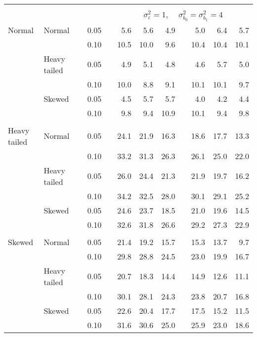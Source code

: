 \begin{table}[ht]
\begin{scriptsize}
\begin{tabular}{ll p{.1cm} c p{.1cm} rrr p{.1cm} rrr}
&&&&&&&&&&&\\
& && && \multicolumn{7}{c}{$\sigma_{\varepsilon}^2 = 1$, \ \ $\sigma_{b_0}^2 = \sigma_{b_1}^2 = 4$} \\ \cline{6-12}
\rowcolor{gray!20} Normal & Normal &  & 0.05 &  & 5.6 & 5.6 & 4.9 &  & 5.0 & 6.4 & 5.7 \\ 
\rowcolor{gray!20}    &  &  & 0.10 &  & 10.5 & 10.0 & 9.6 &  & 10.4 & 10.4 & 10.1 \\ 
\rowcolor{gray!20}    & Heavy tailed &  & 0.05 &  & 4.9 & 5.1 & 4.8 &  & 4.6 & 5.7 & 5.0 \\ 
\rowcolor{gray!20}    &  &  & 0.10 &  & 10.0 & 8.8 & 9.1 &  & 10.1 & 10.1 & 9.7 \\ 
\rowcolor{gray!20}    & Skewed &  & 0.05 &  & 4.5 & 5.7 & 5.7 &  & 4.0 & 4.2 & 4.4 \\ 
\rowcolor{gray!20}    &  &  & 0.10 &  & 9.8 & 9.4 & 10.9 &  & 10.1 & 9.4 & 9.8 \\ 
&&&&&&&&&&&\\
  Heavy tailed & Normal &  & 0.05 &  & 24.1 & 21.9 & 16.3 &  & 18.6 & 17.7 & 13.3 \\ 
  &  &  & 0.10 &  & 33.2 & 31.3 & 26.3 &  & 26.1 & 25.0 & 22.0 \\ 
  & Heavy tailed &  & 0.05 &  & 26.0 & 24.4 & 21.3 &  & 21.9 & 19.7 & 16.2 \\ 
  &  &  & 0.10 &  & 34.2 & 32.5 & 28.0 &  & 30.1 & 29.1 & 25.2 \\ 
  & Skewed &  & 0.05 &  & 24.6 & 23.7 & 18.5 &  & 21.0 & 19.6 & 14.5 \\ 
  &  &  & 0.10 &  & 32.6 & 31.8 & 26.6 &  & 29.2 & 27.3 & 22.9 \\ 
&&&&&&&&&&&\\
  Skewed & Normal &  & 0.05 &  & 21.4 & 19.2 & 15.7 &  & 15.3 & 13.7 & 9.7 \\ 
   &  &  & 0.10 &  & 29.8 & 28.8 & 24.5 &  & 23.0 & 19.9 & 16.7 \\ 
   & Heavy tailed &  & 0.05 &  & 20.7 & 18.3 & 14.4 &  & 14.9 & 12.6 & 11.1 \\ 
   &  &  & 0.10 &  & 30.1 & 28.1 & 24.3 &  & 23.8 & 20.7 & 16.8 \\ 
   & Skewed &  & 0.05 &  & 22.6 & 20.4 & 17.7 &  & 17.5 & 15.2 & 11.5 \\ 
   &  &  & 0.10 &  & 31.6 & 30.6 & 25.0 &  & 25.9 & 23.0 & 18.6 \\ 


\hline
\end{tabular}
\end{scriptsize}
\end{table}


